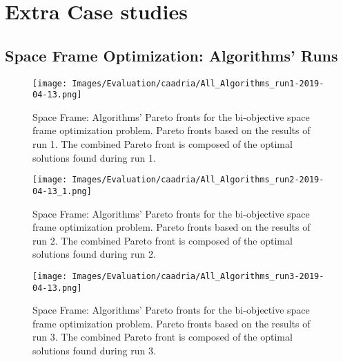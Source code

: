 \appendix\chapter{Extra Case studies}
\label{appendix:appendixB}

\section{Space Frame Optimization: Algorithms' Runs}
\label{sec:spaceframeoptimizationextra}

\begin{figure}[htbp]
	\centering
	\texttt{[image: Images/Evaluation/caadria/All\_Algorithms\_run1-2019-04-13.png]}
	\caption[Space Frame: Pareto Fronts for run 1]{Space Frame: Algorithms' Pareto fronts for the bi-objective space frame optimization problem. Pareto fronts based on the results of run 1. The combined Pareto front is composed of the optimal solutions found during run 1.}
	\label{table:spaceframerun1}
\end{figure}

\begin{figure}[htbp]
	\centering
	\texttt{[image: Images/Evaluation/caadria/All\_Algorithms\_run2-2019-04-13\_1.png]}
	\caption[Space Frame: Pareto Fronts for run 2]{Space Frame: Algorithms' Pareto fronts for the bi-objective space frame optimization problem. Pareto fronts based on the results of run 2. The combined Pareto front is composed of the optimal solutions found during run 2.}
	\label{table:spaceframesrun2}
\end{figure}

\begin{figure}[htbp]
	\centering
	\texttt{[image: Images/Evaluation/caadria/All\_Algorithms\_run3-2019-04-13.png]}
	\caption[Space Frame: Pareto Fronts for run 3]{Space Frame: Algorithms' Pareto fronts for the bi-objective space frame optimization problem. Pareto fronts based on the results of run 3. The combined Pareto front is composed of the optimal solutions found during run 3.}
	\label{table:spaceframerun3}
\end{figure}
